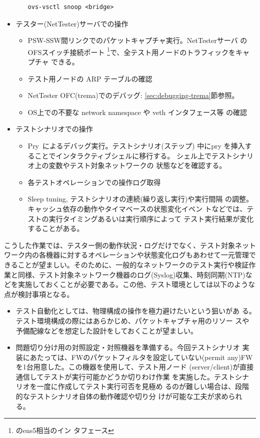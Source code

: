 \begin{itemize}
\begin{itemize}
\begin{lstlisting}
ovs-vsctl snoop <bridge>
\end{lstlisting}
       \end{itemize}
 \item テスター(NetTester)サーバでの操作
       \begin{itemize}
        \item PSW-SSW間リンクでのパケットキャプチャ実行。NetTesterサーバ
              のOFSスイッチ接続ポート
              \footnote{のens5相当のイン
              タフェース}で、全テスト用ノードのトラフィックをキャプチャ
              できる。
        \item テスト用ノードの ARP テーブルの確認
        \item NetTester OFC(trema)でのデバッグ:
              \ref{sec:debugging-trema}節参照。
        \item OS上での不要な network namespace や veth インタフェース等
              の確認
       \end{itemize}
 \item テストシナリオでの操作
       \begin{itemize}
        \item Pry~\cite{pry}によるデバッグ実行。テストシナリオ(ステップ)
              中にpry を挿入することでインタラクティブシェルに移行する。
              シェル上でテストシナリオ上の変数やテスト対象ネットワークの
              状態などを確認する。
        \item 各テストオペレーションでの操作ログ取得
        \item Sleep tuning, テストシナリオの連続(繰り返し実行)や実行間隔
              の調整。キャッシュ依存の動作やタイマベースの状態変化イベン
              トなどでは、テストの実行タイミングあるいは実行順序によって
              テスト実行結果が変化することがある。
       \end{itemize}
\end{itemize}

こうした作業では、テスター側の動作状況・ログだけでなく、テスト対象ネット
ワーク内の各機器に対するオペレーションや状態変化ログもあわせて一元管理で
きることが望ましい。そのために、一般的なネットワークのテスト実行や検証作
業と同様、テスト対象ネットワーク機器のログ(Syslog)収集、時刻同期(NTP)な
どを実施しておくことが必要である。この他、テスト環境としては以下のような
点が検討事項となる。
\begin{itemize}
 \item テスト自動化としては、物理構成の操作を極力避けたいという狙いがあ
       る。テスト環境構成の際にはあらかじめ、パケットキャプチャ用のリソー
       スや予備配線などを想定した設計をしておくことが望ましい。
 \item 問題切り分け用の対照設定・対照機器を準備する。今回テストシナリオ
       実装にあたっては、FWのパケットフィルタを設定していない(permit
       any)FWを1台用意した。この機器を使用して、テスト用ノード
       (server/client)が直接通信してテストが実行可能かどうか切りわけ作業
       を実施した。テストシナリオを一度に作成してテスト実行可否を見極め
       るのが難しい場合は、段階的なテストシナリオ自体の動作確認や切り分
       けが可能な工夫が求められる。
\end{itemize}

